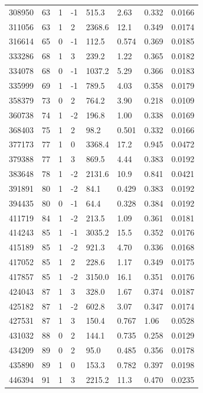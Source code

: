 \documentclass[preview]{standalone}
\begin{document}
{{{\begin{tabular}{L{1.2cm}C{1.2cm} C{0.3cm}C{0.5cm} C{1.4cm}C{1.4cm} C{1.4cm}C{1.4cm}}
  308950  &    63  & 1     & -1 &  515.3  & 2.63  & 0.332 &  0.0166   \\ 
  311056  &    63  & 1     &  2 &  2368.6  & 12.1  & 0.349 &  0.0174   \\ 
  316614  &    65  & 0     & -1 &  112.5  & 0.574  & 0.369 &  0.0185   \\ 
  333286  &    68  & 1     &  3 &  239.2  & 1.22  & 0.365 &  0.0182   \\ 
  334078  &    68  & 0     & -1 &  1037.2  & 5.29  & 0.366 &  0.0183   \\ 
  335999  &    69  & 1     & -1 &  789.5  & 4.03  & 0.358 &  0.0179   \\ 
  358379  &    73  & 0     &  2 &  764.2  & 3.90  & 0.218 &  0.0109   \\ 
  360738  &    74  & 1     & -2 &  196.8  & 1.00  & 0.338 &  0.0169   \\ 
  368403  &    75  & 1     &  2 &  98.2  & 0.501  & 0.332 &  0.0166   \\ 
  377173  &    77  & 1     &  0 &  3368.4  & 17.2  & 0.945 &  0.0472   \\ 
  379388  &    77  & 1     &  3 &  869.5  & 4.44  & 0.383 &  0.0192   \\ 
  383648  &    78  & 1     & -2 &  2131.6  & 10.9  & 0.841 &  0.0421   \\ 
  391891  &    80  & 1     & -2 &  84.1  & 0.429  & 0.383 &  0.0192   \\ 
  394435  &    80  & 0     & -1 &  64.4  & 0.328  & 0.384 &  0.0192   \\ 
  411719  &    84  & 1     & -2 &  213.5  & 1.09  & 0.361 &  0.0181   \\ 
  414243  &    85  & 1     & -1 &  3035.2  & 15.5  & 0.352 &  0.0176   \\ 
  415189  &    85  & 1     & -2 &  921.3  & 4.70  & 0.336 &  0.0168   \\ 
  417052  &    85  & 1     &  2 &  228.6  & 1.17  & 0.349 &  0.0175   \\ 
  417857  &    85  & 1     & -2 &  3150.0  & 16.1  & 0.351 &  0.0176   \\ 
  424043  &    87  & 1     &  3 &  328.0  & 1.67  & 0.374 &  0.0187   \\ 
  425182  &    87  & 1     & -2 &  602.8  & 3.07  & 0.347 &  0.0174   \\ 
  427531  &    87  & 1     &  3 &  150.4  & 0.767  & 1.06 &  0.0528   \\ 
  431032  &    88  & 0     &  2 &  144.1  & 0.735  & 0.258 &  0.0129   \\ 
  434209  &    89  & 0     &  2 &  95.0  & 0.485  & 0.356 &  0.0178   \\ 
  435890  &    89  & 1     &  0 &  153.3  & 0.782  & 0.397 &  0.0198   \\ 
  446394  &    91  & 1     &  3 &  2215.2  & 11.3  & 0.470 &  0.0235   \\ 
\hline 
\end{tabular} 

}}}
\end{document}
